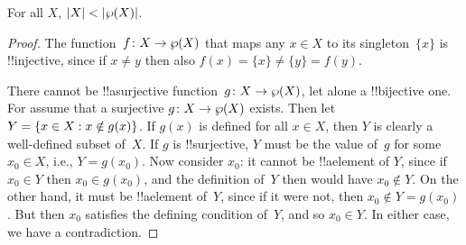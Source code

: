 \documentclass[../../../include/open-logic-section]{subfiles}
\begin{document}
\begin{thm}[Cantor]
For all $X$, $\left| X \right| < \left| \wp(X) \right|$.
\end{thm}

\begin{proof}
The function~$f \colon X \to \wp(X)$ that maps any $x \in X$ to its
singleton~$\{x\}$ is !!{injective}, since if $x \neq y$ then also $f(x) =
\{x\} \neq \{y\} = f(y)$.

There cannot be !!a{surjective} function~$g\colon X \to \wp(X)$, let
alone a !!{bijective} one. For assume that a surjective $g\colon X \to
\wp(X)$ exists.  Then let $Y = \{ x \in X : x \notin g(x) \}$. If
$g(x)$ is defined for all $x \in X$, then $Y$ is clearly a
well-defined subset of~$X$.  If $g$ is !!{surjective}, $Y$ must be the
value of~$g$ for some $x_0 \in X$, i.e., $Y = g(x_0)$.  Now consider
$x_0$: it cannot be !!a{element} of $Y$, since if $x_0 \in Y$ then
$x_0 \in g(x_0)$, and the definition of~$Y$ then would have $x_0
\notin Y$.  On the other hand, it must be !!a{element} of~$Y$, since
if it were not, then $x_0 \notin Y = g(x_0)$.  But then $x_0$
satisfies the defining condition of~$Y$, and so $x_0 \in Y$. In either
case, we have a contradiction.
\end{proof}
\end{document}
